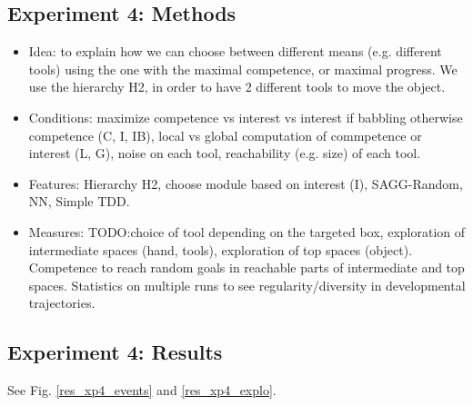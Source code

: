 \documentclass[conference]{include/IEEEtran}
\begin{document}
	\subsection{Experiment 4: Methods}	
		
		\begin{itemize}
			\item Idea: to explain how we can choose between different means (e.g. different tools) using the one with the maximal competence, or maximal progress.
					We use the hierarchy H2, in order to have 2 different tools to move the object.
			
			\item Conditions: maximize competence vs interest vs interest if babbling otherwise competence (C, I, IB), local vs global computation of commpetence or interest (L, G), noise on each tool, reachability (e.g. size) of each tool.
			
			\item Features: Hierarchy H2, choose module based on interest (I), SAGG-Random, NN, Simple TDD.
			
			\item Measures: TODO:choice of tool depending on the targeted box, exploration of intermediate spaces (hand, tools), exploration of top spaces (object). Competence to reach random goals in reachable parts of intermediate and top spaces. 
					Statistics on multiple runs to see regularity/diversity in developmental trajectories.
		\end{itemize}
		

	\subsection{Experiment 4: Results}
	
		See Fig. \ref{res_xp4_events} and \ref{res_xp4_explo}.
		
\end{document}

